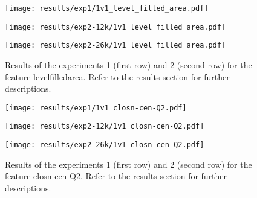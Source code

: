  
\begin{figure}[h!]
    \centering
	\begin{minipage}{0.3\linewidth}
		\texttt{[image: results/exp1/1v1\_level\_filled\_area.pdf]}
	\end{minipage}

	\begin{minipage}{0.3\linewidth}
		\texttt{[image: results/exp2-12k/1v1\_level\_filled\_area.pdf]}
	\end{minipage}
	\begin{minipage}{0.3\linewidth}
		\texttt{[image: results/exp2-26k/1v1\_level\_filled\_area.pdf]}
	\end{minipage}

	\caption[ Results: Feature level\textunderscore filled\textunderscore area]{ Results of the experiments 1 (first row) and 2 (second row) for the feature level\textunderscore filled\textunderscore area. Refer to the results section for further descriptions. }
	\label{fig:appendix_level_filled_area}
\end{figure}
 
\begin{figure}[h!]
    \centering
	\begin{minipage}{0.3\linewidth}
		\texttt{[image: results/exp1/1v1\_closn-cen-Q2.pdf]}
	\end{minipage}

	\begin{minipage}{0.3\linewidth}
		\texttt{[image: results/exp2-12k/1v1\_closn-cen-Q2.pdf]}
	\end{minipage}
	\begin{minipage}{0.3\linewidth}
		\texttt{[image: results/exp2-26k/1v1\_closn-cen-Q2.pdf]}
	\end{minipage}

	\caption[ Results: Feature closn-cen-Q2]{ Results of the experiments 1 (first row) and 2 (second row) for the feature closn-cen-Q2. Refer to the results section for further descriptions. }
	\label{fig:appendix_closn-cen-Q2}
\end{figure}
 \newpage 

